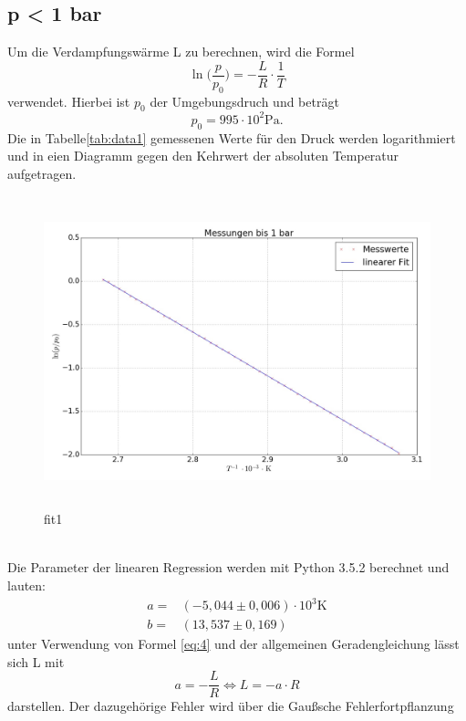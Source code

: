 \subsection{p < 1 bar}
Um die Verdampfungswärme L zu berechnen, wird die Formel
\begin{equation*}
  \ln \bigl(\frac{p}{p_0}\bigr)=-\frac{L}{R} \cdot \frac{1}{T}
\end{equation*}
verwendet. Hierbei ist $p_0$ der Umgebungsdruch und beträgt
\begin{equation*}
  p_0=995\cdot 10^2 \si{\pascal}.
\end{equation*}
Die in Tabelle\ref{tab:data1} gemessenen Werte für den Druck werden logarithmiert und in eien
Diagramm gegen den Kehrwert der absoluten Temperatur aufgetragen. \\
 
\begin{figure}
  \centering
  \includegraphics[height=9cm , width=13.5cm]{fit1.jpg}
  \caption{fit1}
  \label{fig:fit1}
  \end{figure}
  \\
Die Parameter der linearen Regression werden mit Python 3.5.2 berechnet und
lauten:
\begin{align*}
  a =& (-5,044 \pm 0,006) \cdot 10^3 \si{\kelvin} \\
  b =& (13,537 \pm 0,169)
\end{align*}
unter Verwendung von Formel \eqref{eq:4} und der allgemeinen Geradengleichung
lässt sich L mit
\begin{equation}
  a=-\frac{L}{R} \iff L = -a \cdot R
\end{equation}
darstellen. Der dazugehörige Fehler wird über die Gaußsche Fehlerfortpflanzung
